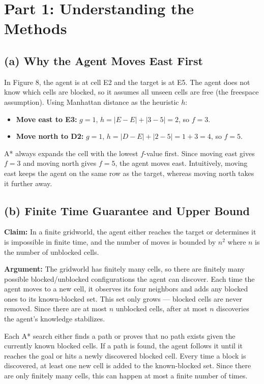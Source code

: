 \documentclass[12pt]{article}
\begin{document}
\section*{Part 1: Understanding the Methods}

\subsection*{(a) Why the Agent Moves East First}

In Figure 8, the agent is at cell E2 and the target is at E5. The agent does not know which cells are blocked, so it assumes all unseen cells are free (the freespace assumption). Using Manhattan distance as the heuristic $h$:

\begin{itemize}
  \item \textbf{Move east to E3:} $g = 1$, $h = |E - E| + |3 - 5| = 2$, so $f = 3$.
  \item \textbf{Move north to D2:} $g = 1$, $h = |D - E| + |2 - 5| = 1 + 3 = 4$, so $f = 5$.
\end{itemize}

A* always expands the cell with the lowest $f$-value first. Since moving east gives $f = 3$ and moving north gives $f = 5$, the agent moves east. Intuitively, moving east keeps the agent on the same row as the target, whereas moving north takes it further away.

\subsection*{(b) Finite Time Guarantee and Upper Bound}

\textbf{Claim:} In a finite gridworld, the agent either reaches the target or determines it is impossible in finite time, and the number of moves is bounded by $n^2$ where $n$ is the number of unblocked cells.

\textbf{Argument:} The gridworld has finitely many cells, so there are finitely many possible blocked/unblocked configurations the agent can discover. Each time the agent moves to a new cell, it observes its four neighbors and adds any blocked ones to its known-blocked set. This set only grows --- blocked cells are never removed. Since there are at most $n$ unblocked cells, after at most $n$ discoveries the agent's knowledge stabilizes.

Each A* search either finds a path or proves that no path exists given the currently known blocked cells. If a path is found, the agent follows it until it reaches the goal or hits a newly discovered blocked cell. Every time a block is discovered, at least one new cell is added to the known-blocked set. Since there are only finitely many cells, this can happen at most a finite number of times.
\end{document}
